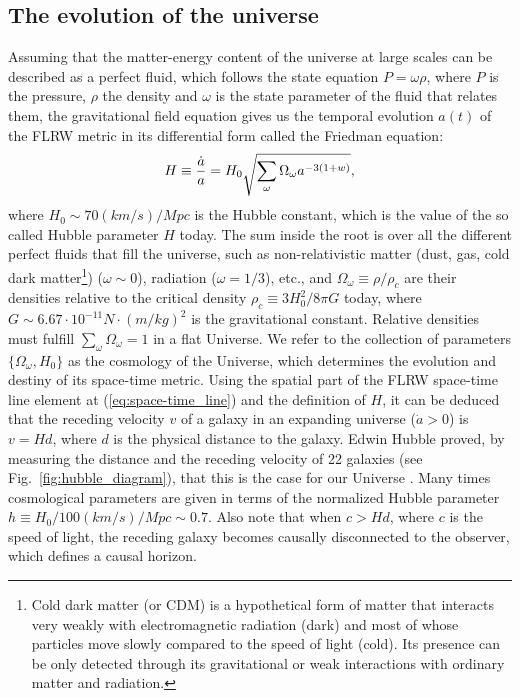 \subsection{The evolution of the universe}
Assuming that the matter-energy content of the universe at large scales can be described as a perfect fluid, which follows the state equation $P = \omega \rho$, where $P$ is the pressure, $\rho$ the density and $\omega$ is the state parameter of the fluid that relates them, the gravitational field equation gives us the temporal evolution $a(t)$ of the FLRW metric in its differential form called the Friedman equation:
\begin{equation}
H \equiv {\dot{a} \over a} = H_0\sqrt{\sum_\omega \Omega_{\omega}a^{-3(1+w)}},
\label{eq:friedman}
\end{equation} 
where $H_0 \sim 70 (km/s)/Mpc$ is the Hubble constant, which is the value of the so called Hubble parameter $H$ today. The sum inside the root is over all the different perfect fluids that fill the universe, such as non-relativistic matter (dust, gas, cold dark matter\footnote{Cold dark matter (or CDM) is a hypothetical form of matter that interacts very weakly with electromagnetic radiation (dark) and most of whose particles move slowly compared to the speed of light (cold). Its presence can be only detected through its gravitational or weak interactions with ordinary matter and radiation.}) ($\omega \sim 0$), radiation ($\omega=1/3$), etc., and $\Omega_\omega \equiv \rho / \rho_c$ are their densities relative to the critical density $\rho_c \equiv 3H^2_0 / 8\pi G$ today, where $G\sim6.67\cdot10^{-11}N\cdot(m/kg)^2$ is the gravitational constant. Relative densities must fulfill $\sum_\omega \Omega_\omega =1$ in a flat Universe. We refer to the collection of parameters $\lbrace \Omega_\omega, H_0 \rbrace$ as the cosmology of the Universe, which determines the evolution and destiny of its space-time metric. Using the spatial part of the FLRW space-time line element at (\ref{eq:space-time_line}) and the definition of $H$, it can be deduced that the receding velocity $v$ of a galaxy in an expanding universe ($\dot{a}>0$) is $v = Hd$, where $d$ is the physical distance to the galaxy. Edwin Hubble proved, by measuring the distance and the receding velocity of 22 galaxies (see Fig.~\ref{fig:hubble_diagram}), that this is the case for our Universe \citep{Hubble1929}. Many times cosmological parameters are given in terms of the normalized Hubble parameter $h\equiv H_0/100(km/s)/Mpc\sim0.7$. Also note that when $c>Hd$, where $c$ is the speed of light, the receding galaxy becomes causally disconnected to the observer, which defines a causal horizon.
